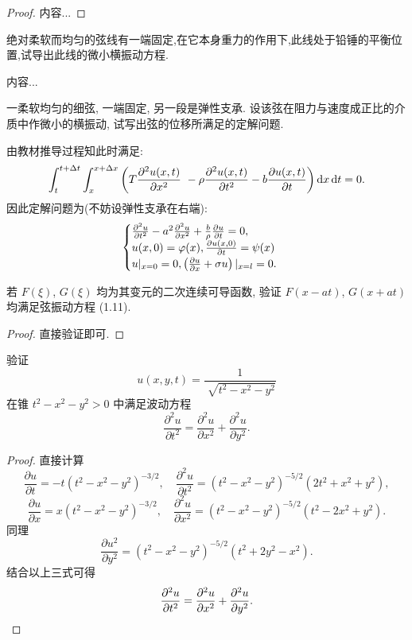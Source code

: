 \begin{proof}
	内容...
\end{proof}


\begin{exercise}
  绝对柔软而均匀的弦线有一端固定,在它本身重力的作用下,此线处于铅锤的平衡位置,试导出此线的微小横振动方程.
\end{exercise}

\begin{solve}
	内容...
\end{solve}


\begin{exercise}
  一柔软均匀的细弦, 一端固定, 另一段是弹性支承.
  设该弦在阻力与速度成正比的介质中作微小的横振动, 试写出弦的位移所满足的定解问题.
\end{exercise}

\begin{solve}
  由教材推导过程知此时满足:
  \[\int_t^{t+\Delta t}\int_x^{x+\Delta x}\left(T\frac{\partial^2u(x,t)}{\partial x^2}\
    - \rho\frac{\partial^2u(x,t)}{\partial t^2}
    - b\frac{\partial u(x,t)}{\partial t}\right)\mathop{}\!\mathrm{d} x\mathop{}\!\mathrm{d} t = 0.\]
  因此定解问题为(不妨设弹性支承在右端):
  \[\begin{cases}
    \frac{\partial^2u}{\partial t^2}
    - a^2\frac{\partial^2u}{\partial x^2}
    + \frac{b}{\rho}\frac{\partial u}{\partial t}
    = 0, \\
    u(x,0)
    = \varphi(x),\frac{\partial u(x,0)}{\partial t}
    = \psi(x)\\u|_{x=0}=0,\left(\frac{\partial u}{\partial x}
    + \sigma u\right)|_{x=l}=0.
  \end{cases}\qedhere\]
\end{solve}


\begin{exercise}
  若 $F(\xi)$, $G(\xi)$ 均为其变元的二次连续可导函数,
  验证 $F(x-at)$, $G(x+at)$ 均满足弦振动方程 (1.11).
\end{exercise}

\begin{proof}
  直接验证即可.
\end{proof}


\begin{exercise}
  验证
  \[u(x,y,t) = \frac{1}{\sqrt[]{t^2-x^2-y^2}}\]
  在锥 $t^2-x^2-y^2>0$ 中满足波动方程
  \[\frac{\partial^2 u}{\partial t^2}
    = \frac{\partial^2 u}{\partial x^2}
      + \frac{\partial^2 u}{\partial y^2}.\]
\end{exercise}

\begin{proof}
  直接计算
  \[\frac{\partial u}{\partial t}=-t(t^2-x^2-y^2)^{-3/2},\quad
    \frac{\partial^2u}{\partial t^2}=(t^2-x^2-y^2)^{-5/2}(2t^2+x^2+y^2),\]
  \[\frac{\partial u}{\partial x}=x(t^2-x^2-y^2)^{-3/2},\quad
    \frac{\partial^2u}{\partial x^2}=(t^2-x^2-y^2)^{-5/2}(t^2-2x^2+y^2).\]
  同理
  \[\frac{\partial u^2}{\partial y^2}=(t^2-x^2-y^2)^{-5/2}(t^2+2y^2-x^2).\]
  结合以上三式可得
  \[\frac{\partial^2u}{\partial t^2}
    = \frac{\partial^2u}{\partial x^2}+\frac{\partial^2u}{\partial y^2}.\qedhere\]
\end{proof}


